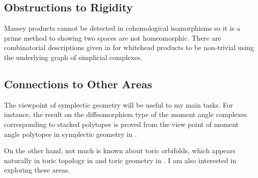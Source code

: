 \documentclass[a4paper]{article}
\begin{document}
\subsection*{Obstructions to Rigidity}
Massey products cannot be detected in cohomological isomorphisms so it is a prime method to showing two spaces are not homeomorphic. There are combinatorial descriptions given in \cite{Denham} for whitehead products to be non-trivial using the underlying graph of simplicial complexes. 

\subsection*{Connections to Other Areas}
The viewpoint of symplectic geometry will be useful to my main tasks. For instance, the result on the diffeomorphism type of the moment angle complexes corresponding to stacked polytopes is proved from the view point of moment angle polytopes in symplectic geometry in \cite{Bosio}. 

On the other hand, not much is known about toric orbifolds, which appears naturally in toric topology in \cite{ToricTopology} and toric geometry in \cite{ToricVarieties}. I am also interested in exploring these areas. 

\pagebreak

\bigskip

\vspace*{-1cm}


\end{document}
